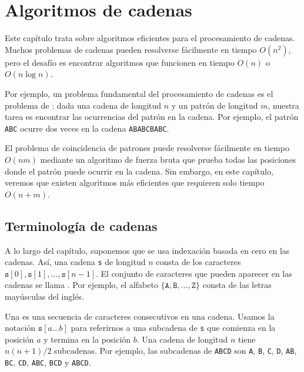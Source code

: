 \chapter{Algoritmos de cadenas}

Este capítulo trata sobre algoritmos eficientes
para el procesamiento de cadenas.
Muchos problemas de cadenas pueden resolverse fácilmente
en tiempo $O(n^2)$, pero el desafío es
encontrar algoritmos que funcionen en tiempo $O(n)$ o $O(n \log n)$.


Por ejemplo, un problema fundamental del procesamiento
de cadenas es el problema de :
dada una cadena de longitud $n$ y un patrón de longitud $m$,
nuestra tarea es encontrar las ocurrencias del patrón
en la cadena.
Por ejemplo, el patrón \texttt{ABC} ocurre dos
veces en la cadena \texttt{ABABCBABC}.

El problema de coincidencia de patrones puede resolverse fácilmente
en tiempo $O(nm)$ mediante un algoritmo de fuerza bruta que
prueba todas las posiciones donde el patrón puede
ocurrir en la cadena.
Sin embargo, en este capítulo, veremos que existen
algoritmos más eficientes que requieren solo
tiempo $O(n+m)$.


\section{Terminología de cadenas}


A lo largo del capítulo, suponemos que
se usa indexación basada en cero en las cadenas.
Así, una cadena \texttt{s} de longitud $n$
consta de los caracteres
$\texttt{s}[0],\texttt{s}[1],\ldots,\texttt{s}[n-1]$.
El conjunto de caracteres que pueden aparecer
en las cadenas se llama .
Por ejemplo, el alfabeto
$\{\texttt{A},\texttt{B},\ldots,\texttt{Z}\}$
consta de las letras mayúsculas del inglés.


Una  es una secuencia de
caracteres consecutivos en una cadena.
Usamos la notación $\texttt{s}[a \ldots b]$
para referirnos a una subcadena de \texttt{s}
que comienza en la posición $a$ y termina en la posición $b$.
Una cadena de longitud $n$ tiene $n(n+1)/2$ subcadenas.
Por ejemplo, las subcadenas de
\texttt{ABCD} son
\texttt{A}, \texttt{B}, \texttt{C}, \texttt{D},
\texttt{AB}, \texttt{BC}, \texttt{CD},
\texttt{ABC}, \texttt{BCD} y \texttt{ABCD}.

